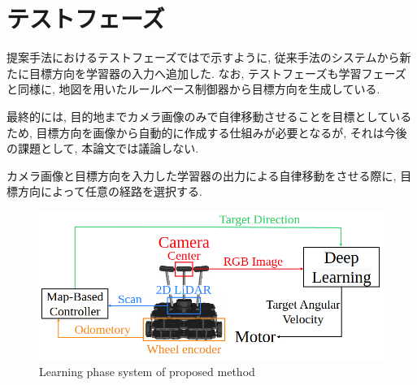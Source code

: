 
\section{テストフェーズ}
提案手法におけるテストフェーズではで示すように, 従来手法のシステムから新たに目標方向を学習器の入力へ追加した. なお, テストフェーズも学習フェーズと同様に, 地図を用いたルールベース制御器から目標方向を生成している. 
\par
最終的には, 目的地までカメラ画像のみで自律移動させることを目標としているため, 目標方向を画像から自動的に作成する仕組みが必要となるが, それは今後の課題として, 本論文では議論しない.


\par
カメラ画像と目標方向を入力した学習器の出力による自律移動をさせる際に, 目標方向によって任意の経路を選択する.

\vspace{1cm}

\begin{figure}[hbtp]
  \centering
 \includegraphics[keepaspectratio, scale=0.46]
      {images/suggest_test_phase.png}
 \caption{Learning phase system of proposed method}
 \label{Fig:suggest_test_phase}
\end{figure}

\newpage
